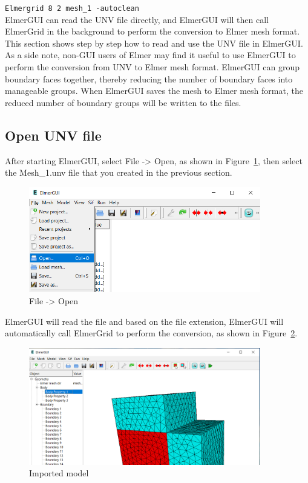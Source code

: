 \texttt{Elmergrid 8 2 mesh\_1 -autoclean}\\

ElmerGUI can read the UNV file directly, and ElmerGUI will then call ElmerGrid in the background to perform the conversion to Elmer mesh format.  This section shows step by step how to read and use the UNV file in ElmerGUI.\\

As a side note, non-GUI users of Elmer may find it useful to use ElmerGUI to perform the conversion from UNV to Elmer mesh format.  ElmerGUI can group boundary faces together, thereby reducing the number of boundary faces into manageable groups.  When ElmerGUI saves the mesh to Elmer mesh format, the reduced number of boundary groups will be written to the files.

\subsection{Open UNV file}

After starting ElmerGUI, select File -> Open, as shown in Figure~\ref{fg:elmergui-1}, then select the Mesh\_1.unv file that you created in the previous section.

\begin{figure}[H]
\centering
\includegraphics[width=0.9\textwidth]{elmergui-1}
\caption{File -> Open}\label{fg:elmergui-1}
\end{figure}

\newpage

ElmerGUI will read the file and based on the file extension, ElmerGUI will automatically call ElmerGrid to perform the conversion, as shown in Figure~\ref{fg:elmergui-2}.

\begin{figure}[H]
\centering
\includegraphics[width=0.9\textwidth]{elmergui-2}
\caption{Imported model}\label{fg:elmergui-2}
\end{figure}


